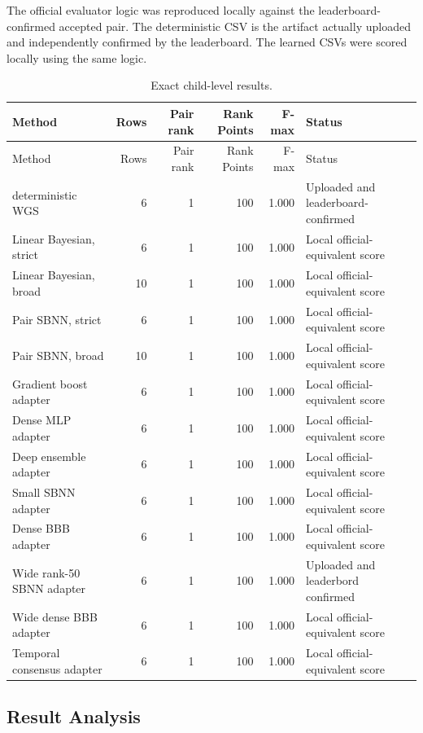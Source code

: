 \documentclass[11pt]{article}
\begin{document}
The official evaluator logic was reproduced locally against the leaderboard-confirmed accepted pair. The deterministic CSV is the artifact actually uploaded and independently confirmed by the leaderboard. The learned CSVs were scored locally using the same logic.

\begin{longtable}{p{}rrrrp{}}
\caption{Exact child-level results.}\\
\toprule
Method & Rows & Pair rank & Rank Points & F-max & Status \\
\midrule
\endfirsthead
\toprule
Method & Rows & Pair rank & Rank Points & F-max & Status \\
\midrule
\endhead
deterministic WGS & 6 & 1 & 100 & 1.000 & Uploaded and leaderboard-confirmed \\
Linear Bayesian, strict & 6 & 1 & 100 & 1.000 & Local official-equivalent score \\
Linear Bayesian, broad & 10 & 1 & 100 & 1.000 & Local official-equivalent score \\
Pair SBNN, strict & 6 & 1 & 100 & 1.000 & Local official-equivalent score \\
Pair SBNN, broad & 10 & 1 & 100 & 1.000 & Local official-equivalent score \\
Gradient boost adapter & 6 & 1 & 100 & 1.000 & Local official-equivalent score \\
Dense MLP adapter & 6 & 1 & 100 & 1.000 & Local official-equivalent score \\
Deep ensemble adapter & 6 & 1 & 100 & 1.000 & Local official-equivalent score \\
Small SBNN adapter & 6 & 1 & 100 & 1.000 & Local official-equivalent score \\
Dense BBB adapter & 6 & 1 & 100 & 1.000 & Local official-equivalent score \\
Wide rank-50 SBNN adapter & 6 & 1 & 100 & 1.000 & Uploaded and leaderbord confirmed\\
Wide dense BBB adapter & 6 & 1 & 100 & 1.000 & Local official-equivalent score \\
Temporal consensus adapter & 6 & 1 & 100 & 1.000 & Local official-equivalent score \\
\bottomrule
\end{longtable}
\subsection{Result Analysis}
\end{document}
